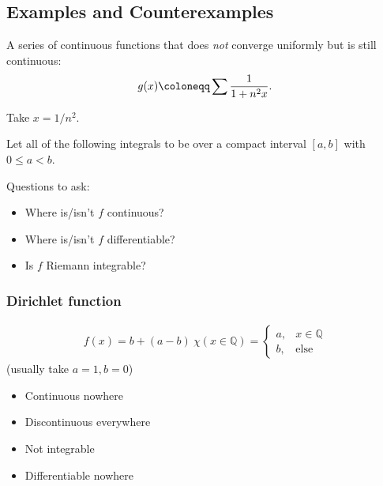 \hypertarget{examples-and-counterexamples}{%
\subsection{Examples and
Counterexamples}\label{examples-and-counterexamples}}

\begin{example}[?]

A series of continuous functions that does \emph{not} converge uniformly
but is still continuous:
\begin{align*}  
g(x) \coloneqq\sum {1 \over 1 + n^2 x}
.\end{align*}

Take \(x = 1/n^2\).

\end{example}

Let all of the following integrals to be over a compact interval
\([a, b]\) with \(0 \leq a < b\).

Questions to ask:

\begin{itemize}
\tightlist
\item
  Where is/isn't \(f\) continuous?
\item
  Where is/isn't \(f\) differentiable?
\item
  Is \(f\) Riemann integrable?
\end{itemize}

\hypertarget{dirichlet-function}{%
\subsubsection{Dirichlet function}\label{dirichlet-function}}

\begin{align*}
f ( x ) = b + (a-b)~\chi(x\in {\mathbb{Q}}) = \begin{cases}
a, & x\in {\mathbb{Q}}\\
b, & \text{else}
\end{cases}
\end{align*}
(usually take \(a=1, b=0\))

\begin{itemize}
\tightlist
\item
  Continuous nowhere
\item
  Discontinuous everywhere
\item
  Not integrable
\item
  Differentiable nowhere
\end{itemize}


